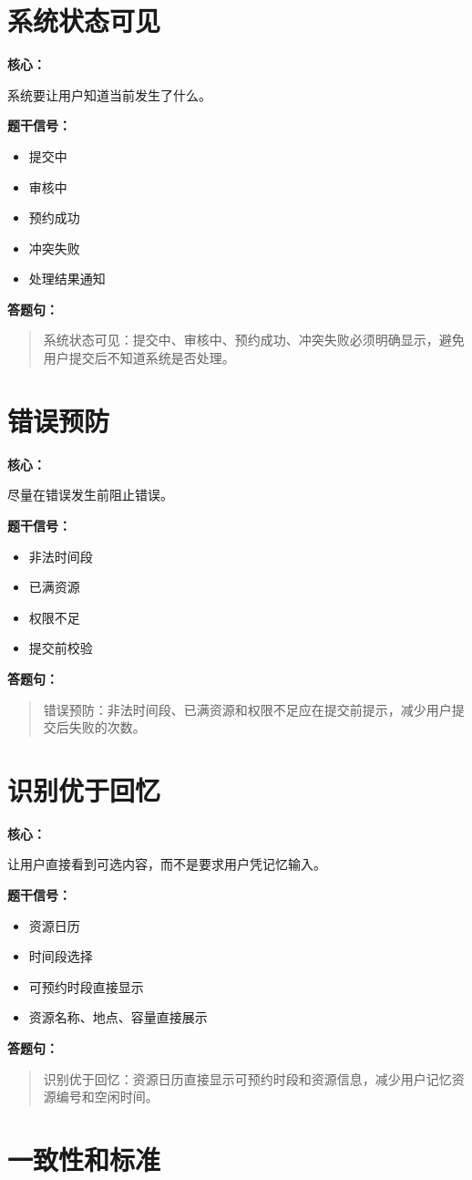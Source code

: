 \documentclass[UTF8,zihao=-4]{ctexart}
\newcommand{\principle}[1]{%
  \section*{\color{TitleBlue}#1}
}
\newcommand{\labeltext}[1]{%
  \textbf{#1}
}
\newenvironment{answerbox}{%
  \begin{quote}\small\color{TextGray}
}{%
  \end{quote}
}
\begin{document}
\principle{系统状态可见}

\labeltext{核心：}
系统要让用户知道当前发生了什么。

\labeltext{题干信号：}
\begin{itemize}
  \item 提交中
  \item 审核中
  \item 预约成功
  \item 冲突失败
  \item 处理结果通知
\end{itemize}

\labeltext{答题句：}
\begin{answerbox}
系统状态可见：提交中、审核中、预约成功、冲突失败必须明确显示，避免用户提交后不知道系统是否处理。
\end{answerbox}

\principle{错误预防}

\labeltext{核心：}
尽量在错误发生前阻止错误。

\labeltext{题干信号：}
\begin{itemize}
  \item 非法时间段
  \item 已满资源
  \item 权限不足
  \item 提交前校验
\end{itemize}

\labeltext{答题句：}
\begin{answerbox}
错误预防：非法时间段、已满资源和权限不足应在提交前提示，减少用户提交后失败的次数。
\end{answerbox}

\principle{识别优于回忆}

\labeltext{核心：}
让用户直接看到可选内容，而不是要求用户凭记忆输入。

\labeltext{题干信号：}
\begin{itemize}
  \item 资源日历
  \item 时间段选择
  \item 可预约时段直接显示
  \item 资源名称、地点、容量直接展示
\end{itemize}

\labeltext{答题句：}
\begin{answerbox}
识别优于回忆：资源日历直接显示可预约时段和资源信息，减少用户记忆资源编号和空闲时间。
\end{answerbox}

\principle{一致性和标准}
\end{document}
